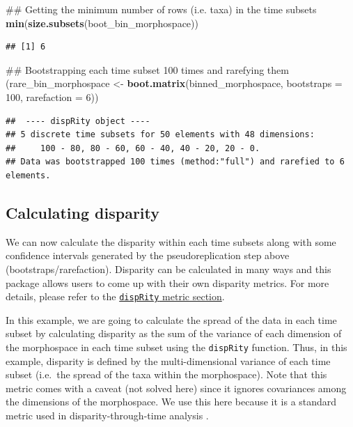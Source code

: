 \documentclass[]{book}
\newenvironment{Shaded}{\begin{snugshade}}{\end{snugshade}}
\newcommand{\KeywordTok}[1]{\textcolor[rgb]{0.13,0.29,0.53}{\textbf{#1}}}
\newcommand{\DataTypeTok}[1]{\textcolor[rgb]{0.13,0.29,0.53}{#1}}
\newcommand{\DecValTok}[1]{\textcolor[rgb]{0.00,0.00,0.81}{#1}}
\newcommand{\StringTok}[1]{\textcolor[rgb]{0.31,0.60,0.02}{#1}}
\newcommand{\NormalTok}[1]{#1}
\theoremstyle{definition}
\theoremstyle{definition}
\theoremstyle{remark}
\begin{document}
\begin{Shaded}
\begin{Highlighting}[]
\NormalTok{## Getting the minimum number of rows (i.e. taxa) in the time subsets}
\KeywordTok{min}\NormalTok{(}\KeywordTok{size.subsets}\NormalTok{(boot_bin_morphospace))}
\end{Highlighting}
\end{Shaded}

\begin{verbatim}
## [1] 6
\end{verbatim}

\begin{Shaded}
\begin{Highlighting}[]
\NormalTok{## Bootstrapping each time subset 100 times and rarefying them }
\NormalTok{(rare_bin_morphospace <-}\StringTok{ }\KeywordTok{boot.matrix}\NormalTok{(binned_morphospace, }\DataTypeTok{bootstraps =} \DecValTok{100}\NormalTok{,}
    \DataTypeTok{rarefaction =} \DecValTok{6}\NormalTok{))}
\end{Highlighting}
\end{Shaded}

\begin{verbatim}
##  ---- dispRity object ---- 
## 5 discrete time subsets for 50 elements with 48 dimensions:
##     100 - 80, 80 - 60, 60 - 40, 40 - 20, 20 - 0.
## Data was bootstrapped 100 times (method:"full") and rarefied to 6 elements.
\end{verbatim}

\subsection{Calculating disparity}\label{calculating-disparity}

We can now calculate the disparity within each time subsets along with
some confidence intervals generated by the pseudoreplication step above
(bootstraps/rarefaction). Disparity can be calculated in many ways and
this package allows users to come up with their own disparity metrics.
For more details, please refer to the
\protect\hyperlink{disparity-metrics}{\texttt{dispRity} metric section}.

In this example, we are going to calculate the spread of the data in
each time subset by calculating disparity as the sum of the variance of
each dimension of the morphospace in each time subset using the
\texttt{dispRity} function. Thus, in this example, disparity is defined
by the multi-dimensional variance of each time subset (i.e.~the spread
of the taxa within the morphospace). Note that this metric comes with a
caveat (not solved here) since it ignores covariances among the
dimensions of the morphospace. We use this here because it is a standard
metric used in disparity-through-time analysis \citep{Wills1994}.
\end{document}
